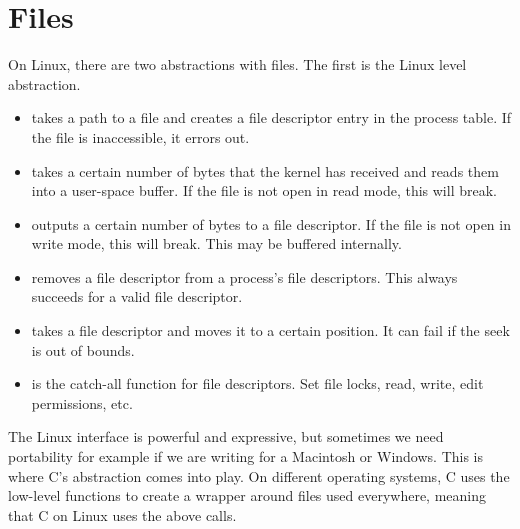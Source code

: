 \section{Files}
	 
On Linux, there are two abstractions with files. The first is the Linux  level abstraction.
	 
\begin{itemize}
	\item {} takes a path to a file and creates a file descriptor entry in the process table. If the file is inaccessible, it errors out.
	\item {} takes a certain number of bytes that the kernel has received and reads them into a user-space buffer. If the file is not open in read mode, this will break.
	\item {} outputs a certain number of bytes to a file descriptor. If the file is not open in write mode, this will break. This may be buffered internally.
	\item {} removes a file descriptor from a process's file descriptors. This always succeeds for a valid file descriptor.
	\item {} takes a file descriptor and moves it to a certain position. It can fail if the seek is out of bounds.
	\item {} is the catch-all function for file descriptors. Set file locks, read, write, edit permissions, etc.
\end{itemize}
	 
The Linux interface is powerful and expressive, but sometimes we need portability for example if we are writing for a Macintosh or Windows.
This is where C's abstraction comes into play.
On different operating systems, C uses the low-level functions to create a wrapper around files used everywhere, meaning that C on Linux uses the above calls.
	 
